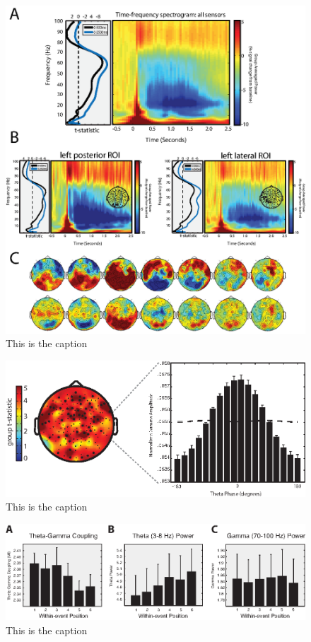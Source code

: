 \begin{figure}[htbp]
\centering
\includegraphics{figures/chapter3_suppfigure1}
\caption{This is the caption}
\end{figure}

\begin{figure}[htbp]
\centering
\includegraphics{figures/chapter3_suppfigure2}
\caption{This is the caption}
\end{figure}

\begin{figure}[htbp]
\centering
\includegraphics{figures/chapter3_suppfigure3}
\caption{This is the caption}
\end{figure}

